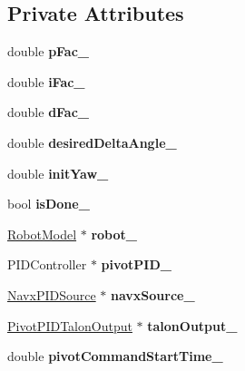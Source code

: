 \subsection*{Private Attributes}
\begin{DoxyCompactItemize}
\item 
\mbox{\label{class_pivot_command_af19ee15f8b4d195bf02fbc697eba1641}} 
double {\bfseries p\+Fac\+\_\+}
\item 
\mbox{\label{class_pivot_command_a8a4c07edea472ab21522cca70fe531a2}} 
double {\bfseries i\+Fac\+\_\+}
\item 
\mbox{\label{class_pivot_command_a076fe76ca613db3f914408607e91d7bc}} 
double {\bfseries d\+Fac\+\_\+}
\item 
\mbox{\label{class_pivot_command_aaf3bb529c25ee4d2ed040fdacb794d1f}} 
double {\bfseries desired\+Delta\+Angle\+\_\+}
\item 
\mbox{\label{class_pivot_command_aa0fc36f13532c492f5e86b4d5d0be93e}} 
double {\bfseries init\+Yaw\+\_\+}
\item 
\mbox{\label{class_pivot_command_a40b669643047869696913de119de0347}} 
bool {\bfseries is\+Done\+\_\+}
\item 
\mbox{\label{class_pivot_command_ad1fd030762a6b95d8c8ccad7375c2dcb}} 
\hyperlink{class_robot_model}{Robot\+Model} $\ast$ {\bfseries robot\+\_\+}
\item 
\mbox{\label{class_pivot_command_ae2fcdfa0e3be71c8b06a42440dbe3003}} 
P\+I\+D\+Controller $\ast$ {\bfseries pivot\+P\+I\+D\+\_\+}
\item 
\mbox{\label{class_pivot_command_a5fd31234c07b80cc3ffddb3ce28bc49b}} 
\hyperlink{class_navx_p_i_d_source}{Navx\+P\+I\+D\+Source} $\ast$ {\bfseries navx\+Source\+\_\+}
\item 
\mbox{\label{class_pivot_command_a590ea9a551076484febed96b6f7d9a64}} 
\hyperlink{class_pivot_p_i_d_talon_output}{Pivot\+P\+I\+D\+Talon\+Output} $\ast$ {\bfseries talon\+Output\+\_\+}
\item 
\mbox{\label{class_pivot_command_a5ec7f0d7b577e7830251e78a895798b5}} 
double {\bfseries pivot\+Command\+Start\+Time\+\_\+}
\end{DoxyCompactItemize}
